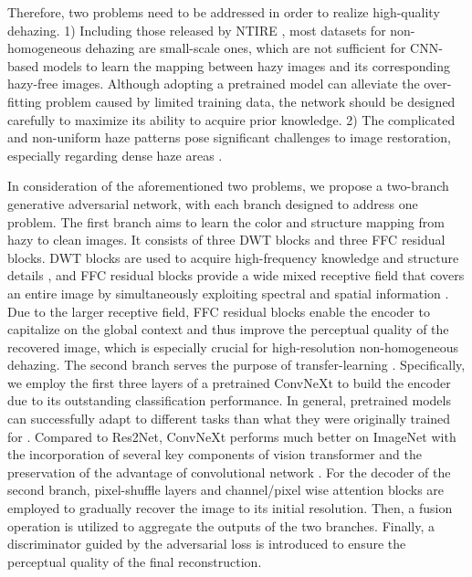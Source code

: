 \documentclass[10pt,twocolumn,letterpaper]{article}
\begin{document}
Therefore, two problems need to be addressed in order to realize high-quality dehazing. 1) Including those released by NTIRE \cite{nh-haze2020,densehaze2019}, most datasets for non-homogeneous dehazing are small-scale ones, which are not sufficient for CNN-based models to learn the mapping between hazy images and its corresponding hazy-free images. Although adopting a pretrained model can alleviate the over-fitting problem caused by limited training data, the network should be designed carefully to maximize its ability to acquire prior knowledge. 2) The complicated and non-uniform haze patterns pose significant challenges to image restoration, especially regarding dense haze areas \cite{DW-GAN,ntire2021}.



In consideration of the aforementioned two problems, we propose a two-branch generative adversarial network, with each branch designed to address one problem.
 The first branch aims to learn the color and structure mapping from hazy to clean images. It consists of three DWT blocks and three FFC \cite{FFC,lama} residual blocks. DWT blocks are used to acquire high-frequency knowledge and structure details \cite{DW-GAN,WSAMF-Net,Liu_2020_ECCVW}, and FFC residual blocks provide a wide mixed receptive field that covers an entire image by simultaneously exploiting spectral and spatial information \cite{lama,glama}. Due to the larger receptive field, FFC residual blocks enable the encoder to capitalize on the global context and thus improve the perceptual quality of the recovered image, which is especially crucial for high-resolution non-homogeneous dehazing. The second branch serves the purpose of transfer-learning \cite{transfer-learning1,transfer-learning2,transfer-learning3}. Specifically, we employ the first three layers of a pretrained ConvNeXt to build the encoder due to its outstanding classification performance. In general, pretrained models can successfully adapt to different tasks than what they were originally trained for \cite{ntire2021}. Compared to Res2Net, ConvNeXt performs much better on ImageNet with the incorporation of several key components of vision transformer and the preservation of the advantage of convolutional network \cite{convnext,VisionTransformer}. For the decoder of the second branch, pixel-shuffle layers and channel/pixel wise attention blocks \cite{pixel-shuffle-attention} are employed to gradually recover the image to its initial resolution. Then, a fusion operation \cite{ntire2021} is utilized to aggregate the outputs of the two branches. Finally, a discriminator guided by the adversarial loss \cite{DW-GAN} is introduced to ensure the perceptual quality of the final reconstruction.
\end{document}
